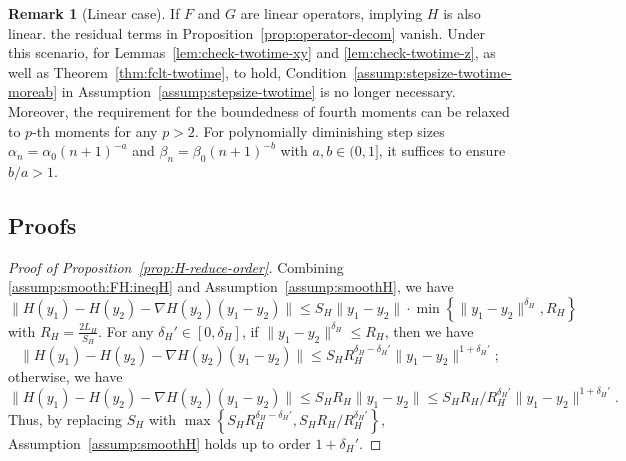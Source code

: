 \documentclass[11pt]{article}
\theoremstyle{plain}
\theoremstyle{definition}
\newtheorem{rema}{Remark}[section]
\def\Hsmooth{{\delta_H}}
\def\nablaH{\nabla H}
\newcommand{\yy}{{y}}
\begin{document}
\begin{appendix}
\begin{rema}[Linear case]
If $F$ and $G$ are linear operators, implying $H$ is also linear. the residual terms in Proposition~\ref{prop:operator-decom} vanish.
Under this scenario, for Lemmas~\ref{lem:check-twotime-xy} and \ref{lem:check-twotime-z}, as well as Theorem~\ref{thm:fclt-twotime}, to hold, Condition~\ref{assump:stepsize-twotime-moreab} in Assumption~\ref{assump:stepsize-twotime} is no longer necessary. Moreover, the requirement for the boundedness of fourth moments can be relaxed to $p$-th moments for any $p>2$.
For 
polynomially diminishing step sizes 
$\alpha_{n} = \alpha_{0} (n+1)^{-a}$ and $\beta_{n} = \beta_{0} (n+1)^{-b}$ with $a, b \in (0, 1]$, 
it suffices to ensure $b / a > 1$.
\end{rema}

\subsection{Proofs}
\label{sec:fclt:proof:assump:proof}

\begin{proof}[Proof of Proposition~\ref{prop:H-reduce-order}]
Combining \eqref{assump:smooth:FH:ineqH} and Assumption~\ref{assump:smoothH}, we have
\begin{equation*} 
    \| H(y_1) -  H(y_2) - \nablaH(y_2) (y_1-y_2)  \| \le S_H \|y_1-y_2\| \cdot \min\left\{\|y_1-y_2\|^\Hsmooth, R_H \right\}
\end{equation*}
with $R_H = \frac{2L_H}{S_H}$.
For any $\Hsmooth' \in [0, \Hsmooth]$,
if $\| \yy_1 - \yy_2 \|^\Hsmooth \le R_H$, then we have 
\begin{equation*}
    \| H(\yy_1) - H(\yy_2) - \nablaH(\yy_2) (\yy_1-\yy_2) \| \le S_H R_H^{\Hsmooth - \Hsmooth'} \| \yy_1 - \yy_2 \|^{1+\Hsmooth'};
\end{equation*}
otherwise, we have
\begin{equation*}
    \| H(\yy_1) - H(\yy_2) - \nablaH(\yy_2) (\yy_1-\yy_2) \| \le S_H R_H \| \yy_1 - \yy_2 \| \le S_H R_H / R_H^{\Hsmooth'}  \| \yy_1 - \yy_2 \|^{1+\Hsmooth'}.
\end{equation*}
Thus, by replacing $S_H$ with $\max\left\{S_H R_H^{\Hsmooth - \Hsmooth'}, S_H R_H /  R_H^{\Hsmooth'} \right\}$,
Assumption~\ref{assump:smoothH} holds up to order $1+\Hsmooth'$.
\end{proof}


\end{appendix}
\end{document}
